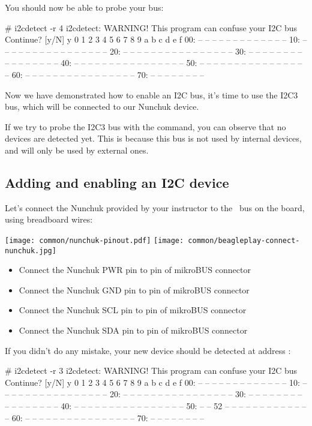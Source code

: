 You should now be able to probe your bus:

\begin{bashinput}
# i2cdetect -r 4
i2cdetect: WARNING! This program can confuse your I2C bus
Continue? [y/N] y
     0  1  2  3  4  5  6  7  8  9  a  b  c  d  e  f
00:          -- -- -- -- -- -- -- -- -- -- -- -- --
10: -- -- -- -- -- -- -- -- -- -- -- -- -- -- -- --
20: -- -- -- -- -- -- -- -- -- -- -- -- -- -- -- --
30: -- -- -- -- -- -- -- -- -- -- -- -- -- -- -- --
40: -- -- -- -- -- -- -- -- -- -- -- -- -- -- -- --
50: -- -- -- -- -- -- -- -- -- -- -- -- -- -- -- --
60: -- -- -- -- -- -- -- -- -- -- -- -- -- -- -- --
70: -- -- -- -- -- -- -- --
\end{bashinput}

Now we have demonstrated how to enable an I2C bus, it's time to
use the I2C3 bus, which will be connected to our Nunchuk device.

If we try to probe the I2C3 bus with the 
command, you can observe that no devices are detected yet.
This is because this bus is not used by internal devices, and will
only be used by external ones.

\subsection{Adding and enabling an I2C device}

Let's connect the Nunchuk provided by your instructor
to the \busname\ bus on the board, using breadboard wires:

\texttt{[image: common/nunchuk-pinout.pdf]}
\texttt{[image: common/beagleplay-connect-nunchuk.jpg]}

\begin{itemize}
\item Connect the Nunchuk PWR pin to  pin of mikroBUS connector
\item Connect the Nunchuk GND pin to  pin of mikroBUS connector
\item Connect the Nunchuk SCL pin to  pin of mikroBUS connector
\item Connect the Nunchuk SDA pin to  pin of mikroBUS connector
\end{itemize}

If you didn't do any mistake, your new device should be detected at
address :

\begin{bashinput}
# i2cdetect -r 3
i2cdetect: WARNING! This program can confuse your I2C bus
Continue? [y/N] y
     0  1  2  3  4  5  6  7  8  9  a  b  c  d  e  f
00:          -- -- -- -- -- -- -- -- -- -- -- -- --
10: -- -- -- -- -- -- -- -- -- -- -- -- -- -- -- --
20: -- -- -- -- -- -- -- -- -- -- -- -- -- -- -- --
30: -- -- -- -- -- -- -- -- -- -- -- -- -- -- -- --
40: -- -- -- -- -- -- -- -- -- -- -- -- -- -- -- --
50: -- -- 52 -- -- -- -- -- -- -- -- -- -- -- -- --
60: -- -- -- -- -- -- -- -- -- -- -- -- -- -- -- --
70: -- -- -- -- -- -- -- --
\end{bashinput}

